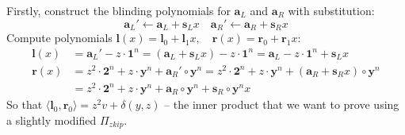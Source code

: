 \documentclass[../lecture-notes-148x210.tex]{subfiles}
\begin{document}
Firstly, construct the blinding polynomials for $\mathbf{a}_L$ and $\mathbf{a}_R$ with substitution:
$$\mathbf{a}_L' \gets \mathbf{a}_L + \mathbf{s}_L x \quad \mathbf{a}_R' \gets \mathbf{a}_R + \mathbf{s}_R x$$
Compute polynomials $\mathbf{l}(x) = \mathbf{l}_0 + \mathbf{l}_1 x, \quad \mathbf{r}(x) = \mathbf{r}_0 + \mathbf{r}_1 x$:
\begin{align*}
    \mathbf{l}(x) &= \mathbf{a}_L' - z \cdot \mathbf{1}^n = (\mathbf{a}_L + \mathbf{s}_L x) - z \cdot \mathbf{1}^n = \mathbf{a}_L - z \cdot \mathbf{1}^n + \mathbf{s}_L x\\
    \mathbf{r}(x) &= z^2 \cdot \mathbf{2}^n + z \cdot \mathbf{y}^n + \mathbf{a}_R' \circ \mathbf{y}^n = z^2 \cdot \mathbf{2}^n + z \cdot \mathbf{y}^n + (\mathbf{a}_R + \mathbf{s}_R x) \circ \mathbf{y}^n \\
    & = z^2 \cdot \mathbf{2}^n + z \cdot \mathbf{y}^n + \mathbf{a}_R \circ \mathbf{y}^n + \mathbf{s}_R \circ \mathbf{y}^n x
\end{align*}
So that $\langle \mathbf{l}_0, \mathbf{r}_0 \rangle = z^2v + \delta(y,z)$ -- the inner product that we want to prove using a slightly modified $\Pi_{zkip}$.
\end{document}

